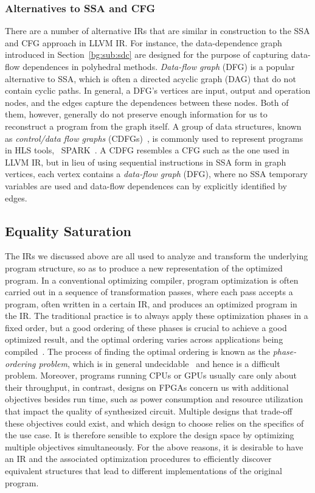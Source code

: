 \subsubsection{Alternatives to SSA and CFG}

There are a number of alternative IRs that are similar in construction to
the SSA and CFG approach in LLVM IR\@.  For instance, the data-dependence
graph~\cite{rau94} introduced in Section~\ref{bg:sub:sdc} are designed
for the purpose of capturing data-flow dependences in polyhedral methods.
\emph{Data-flow graph} (DFG) is a popular alternative to SSA, which is often
a directed acyclic graph (DAG) that do not contain cyclic paths.  In general,
a DFG's vertices are input, output and operation nodes, and the edges capture
the dependences between these nodes.  Both of them, however, generally do
not preserve enough information for us to reconstruct a program from the
graph itself.  A group of data structures, known as \emph{control/data flow
graphs} (CDFGs)~\cite{orailoglu86}, is commonly used to represent programs in
HLS tools, \eg~SPARK~\cite{gupta04}.  A CDFG resembles a CFG such as the one
used in LLVM IR, but in lieu of using sequential instructions in SSA form in
graph vertices, each vertex contains a \emph{data-flow graph} (DFG), where no
SSA temporary variables are used and data-flow dependences can by explicitly
identified by edges.


\subsection{Equality Saturation}
\label{bg:sub:equality_saturation}

The IRs we discussed above are all used to analyze and transform the underlying
program structure, so as to produce a new representation of the optimized
program.  In a conventional optimizing compiler, program optimization is
often carried out in a sequence of transformation passes, where each pass
accepts a program, often written in a certain IR, and produces an optimized
program in the IR\@.  The traditional practice is to always apply these
optimization phases in a fixed order, but a good ordering of these phases
is crucial to achieve a good optimized result, and the optimal ordering
varies across applications being compiled~\cite{almagor04}.  The process of
finding the optimal ordering is known as the \emph{phase-ordering problem},
which is in general undecidable~\cite{touati06} and hence is a difficult
problem.  Moreover, programs running CPUs or GPUs usually care only about
their throughput, in contrast, designs on FPGAs concern us with additional
objectives besides run time, such as power consumption and resource utilization
that impact the quality of synthesized circuit.  Multiple designs that
trade-off these objectives could exist, and which design to choose relies
on the specifics of the use case.  It is therefore sensible to explore the
design space by optimizing multiple objectives simultaneously.  For the
above reasons, it is desirable to have an IR and the associated optimization
procedures to efficiently discover equivalent structures that lead to different
implementations of the original program.

